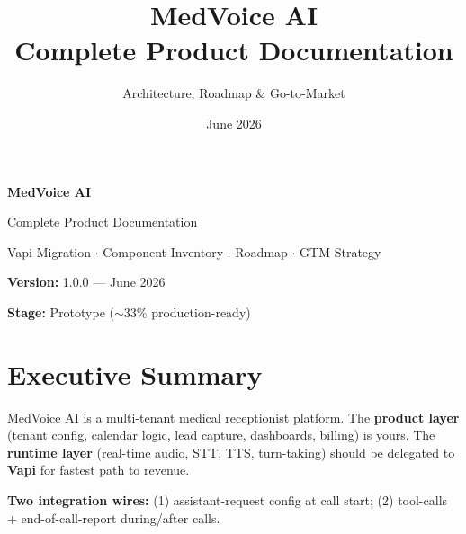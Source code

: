 \documentclass[11pt,a4paper]{report}
\title{MedVoice AI\\Complete Product Documentation}
\author{Architecture, Roadmap \& Go-to-Market}
\date{June 2026}
\begin{document}
\begin{titlepage}
\centering
\vspace*{2cm}
{\Huge\bfseries MedVoice AI\par}
\vspace{0.8cm}
{\Large Complete Product Documentation\par}
\vspace{0.5cm}
{\large Vapi Migration $\cdot$ Component Inventory $\cdot$ Roadmap $\cdot$ GTM Strategy\par}
\vfill
{\textbf{Version:} 1.0.0 --- June 2026\par}
{\textbf{Stage:} Prototype ($\sim$33\% production-ready)\par}
\vspace{1cm}
\end{titlepage}

\tableofcontents
\newpage

\chapter*{Executive Summary}

MedVoice AI is a multi-tenant medical receptionist platform. The \textbf{product layer} (tenant config, calendar logic, lead capture, dashboards, billing) is yours. The \textbf{runtime layer} (real-time audio, STT, TTS, turn-taking) should be delegated to \textbf{Vapi} for fastest path to revenue.

\begin{center}
\end{center}

\textbf{Two integration wires:} (1) assistant-request config at call start; (2) tool-calls + end-of-call-report during/after calls.
\end{document}
